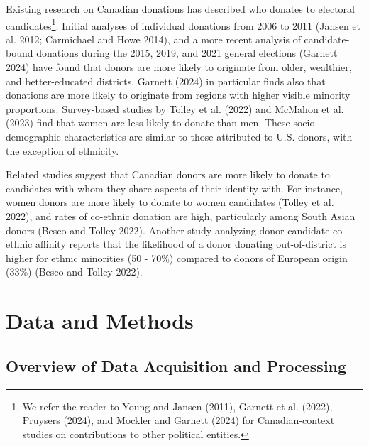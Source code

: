 \documentclass[
  letterpaper,
  DIV=11,
  numbers=noendperiod]{scrartcl}
\begin{document}
Existing research on Canadian donations has described who donates to
electoral candidates\footnote{We refer the reader to Young and Jansen
  (2011), Garnett et al. (2022), Pruysers (2024), and Mockler and
  Garnett (2024) for Canadian-context studies on contributions to other
  political entities.}. Initial analyses of individual donations from
2006 to 2011 (Jansen et al. 2012; Carmichael and Howe 2014), and a more
recent analysis of candidate-bound donations during the 2015, 2019, and
2021 general elections (Garnett 2024) have found that donors are more
likely to originate from older, wealthier, and better-educated
districts. Garnett (2024) in particular finds also that donations are
more likely to originate from regions with higher visible minority
proportions. Survey-based studies by Tolley et al. (2022) and McMahon et
al. (2023) find that women are less likely to donate than men. These
socio-demographic characteristics are similar to those attributed to
U.S. donors, with the exception of ethnicity.

Related studies suggest that Canadian donors are more likely to donate
to candidates with whom they share aspects of their identity with. For
instance, women donors are more likely to donate to women candidates
(Tolley et al. 2022), and rates of co-ethnic donation are high,
particularly among South Asian donors (Besco and Tolley 2022). Another
study analyzing donor-candidate co-ethnic affinity reports that the
likelihood of a donor donating out-of-district is higher for ethnic
minorities (50 - 70\%) compared to donors of European origin (33\%)
(Besco and Tolley 2022).

\section{Data and Methods}\label{sec-data}

\subsection{Overview of Data Acquisition and
Processing}\label{sec-data-overview}
\end{document}
